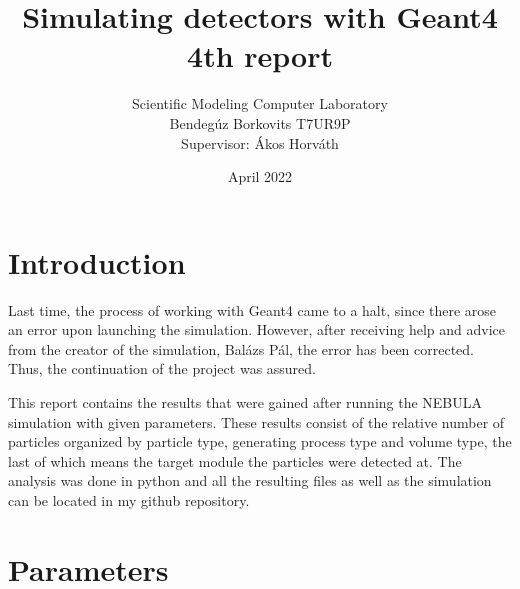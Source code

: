 \documentclass[12pt,twocolumn]{article}
\title{Simulating detectors with Geant4 4th report}
\author{Scientific Modeling Computer Laboratory\\Bendegúz Borkovits T7UR9P\\Supervisor: Ákos Horváth}
\date{April 2022}
\begin{document}
\maketitle

\section{Introduction}

Last time, the process of working with Geant4 came to a halt, since there arose an error upon launching the simulation. However, after receiving help and advice from the creator of the simulation, Balázs Pál, the error has been corrected. \cite{masterdesky} Thus, the continuation of the project was assured.

This report contains the results that were gained after running the NEBULA simulation with given parameters. These results consist of the relative number of particles organized by particle type, generating process type and volume type, the last of which means the target module the particles were detected at. The analysis was done in python and all the resulting files as well as the simulation can be located in my github repository. \cite{borbende}

\section{Parameters}
\end{document}
